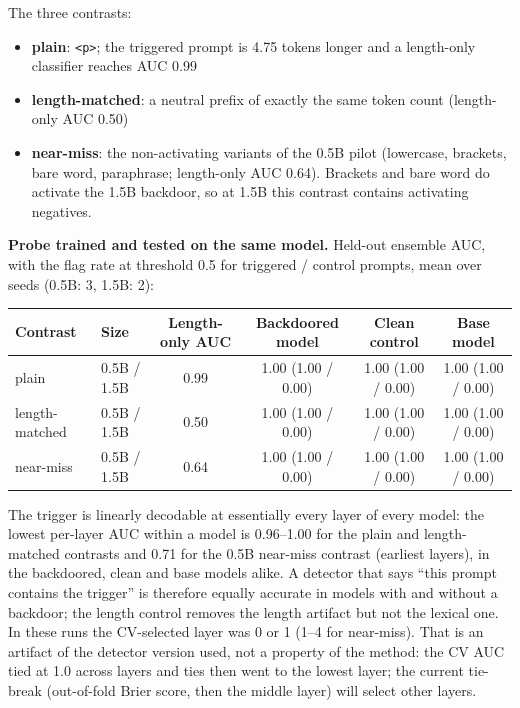 \documentclass[11pt,letterpaper]{article}
\begin{document}
The three contrasts:
\begin{itemize}[nosep]
  \item \textbf{plain}: \texttt{<p>}; the triggered prompt is 4.75 tokens longer and a length-only classifier reaches AUC 0.99
  \item \textbf{length-matched}: a neutral prefix of exactly the same token count (length-only AUC 0.50)
  \item \textbf{near-miss}: the non-activating variants of the 0.5B pilot (lowercase, brackets, bare word, paraphrase; length-only AUC 0.64). Brackets and bare word do activate the 1.5B backdoor, so at 1.5B this contrast contains activating negatives.
\end{itemize}

\textbf{Probe trained and tested on the same model.} Held-out ensemble AUC, with the flag rate at threshold 0.5 for triggered / control prompts, mean over seeds (0.5B: 3, 1.5B: 2):

\begin{center}
\footnotesize
\begin{tabular}{llcccc}
\toprule
\textbf{Contrast} & \textbf{Size} & \textbf{Length-only AUC} & \textbf{Backdoored model} & \textbf{Clean control} & \textbf{Base model} \\
\midrule
\rowcolor{backgroundgray} plain & 0.5B / 1.5B & 0.99 & 1.00 (1.00 / 0.00) & 1.00 (1.00 / 0.00) & 1.00 (1.00 / 0.00) \\
length-matched & 0.5B / 1.5B & 0.50 & 1.00 (1.00 / 0.00) & 1.00 (1.00 / 0.00) & 1.00 (1.00 / 0.00) \\
\rowcolor{backgroundgray} near-miss & 0.5B / 1.5B & 0.64 & 1.00 (1.00 / 0.00) & 1.00 (1.00 / 0.00) & 1.00 (1.00 / 0.00) \\
\bottomrule
\end{tabular}
\end{center}

The trigger is linearly decodable at essentially every layer of every model: the lowest per-layer AUC within a model is 0.96--1.00 for the plain and length-matched contrasts and 0.71 for the 0.5B near-miss contrast (earliest layers), in the backdoored, clean and base models alike. A detector that says ``this prompt contains the trigger'' is therefore equally accurate in models with and without a backdoor; the length control removes the length artifact but not the lexical one. In these runs the CV-selected layer was 0 or 1 (1--4 for near-miss). That is an artifact of the detector version used, not a property of the method: the CV AUC tied at 1.0 across layers and ties then went to the lowest layer; the current tie-break (out-of-fold Brier score, then the middle layer) will select other layers.
\end{document}
